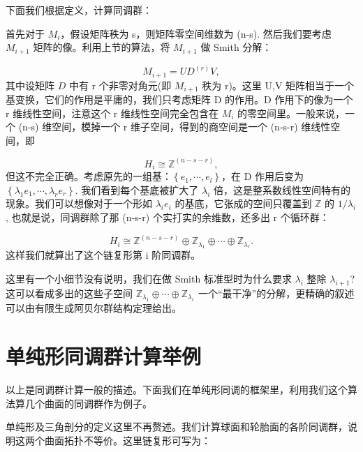 \documentclass[UTF8]{ctexart}
\begin{document}
下面我们根据定义，计算同调群：

首先对于 $M_{i}$，假设矩阵秩为 s，则矩阵零空间维数为 (n-s). 然后我们要考虑 $M_{i+1}$ 矩阵的像。利用上节的算法，将
$M_{i+1}$ 做 Smith 分解：

\begin{equation}
M_{i+1}=UD^{(r)}V,
\end{equation}
其中设矩阵 $D$ 中有 r 个非零对角元(即 $M_{i+1}$ 秩为 r)。这里 U,V 矩阵相当于一个基变换，它们的作用是平庸的，我们只考虑矩阵
D 的作用。D 作用下的像为一个 r 维线性空间，注意这个 r 维线性空间完全包含在 $M_{i}$ 的零空间里。一般来说，一个
(n-s) 维空间，模掉一个 r 维子空间，得到的商空间是一个 (n-s-r) 维线性空间，即

\begin{equation}
H_{i}\cong\mathbb{Z}^{(n-s-r)},
\end{equation}
但这不完全正确。考虑原先的一组基：$\left\{ e_{1},\cdots,e_{l}\right\} $，在 D 作用后变为
$\left\{ \lambda_{1}e_{1},\cdots,\lambda_{r}e_{r}\right\} $. 我们看到每个基底被扩大了
$\lambda_{i}$ 倍，这是整系数线性空间特有的现象。我们可以想像对于一个形如 $\lambda_{i}e_{i}$ 的基底，它张成的空间只覆盖到
$\mathbb{Z}$ 的 $1/\lambda_{i}$, 也就是说，同调群除了那 (n-s-r) 个实打实的余维数，还多出
r 个循环群：

\begin{equation}
H_{i}\cong\mathbb{Z}^{(n-s-r)}\oplus\mathbb{Z}_{\lambda_{1}}\oplus\cdots\oplus\mathbb{Z}_{\lambda_{r}}.
\end{equation}
这样我们就算出了这个链复形第 i 阶同调群。

这里有一个小细节没有说明，我们在做 Smith 标准型时为什么要求 $\lambda_{i}$ 整除 $\lambda_{i+1}$?
这可以看成多出的这些子空间 $\mathbb{Z}_{\lambda_{1}}\oplus\cdots\oplus\mathbb{Z}_{\lambda_{r}}$
一个“最干净”的分解，更精确的叙述可以由有限生成阿贝尔群结构定理给出。

\section*{单纯形同调群计算举例}
\noindent
以上是同调群计算一般的描述。下面我们在单纯形同调的框架里，利用我们这个算法算几个曲面的同调群作为例子。

单纯形及三角剖分的定义这里不再赘述。我们计算球面和轮胎面的各阶同调群，说明这两个曲面拓扑不等价。这里链复形可写为：
\end{document}
